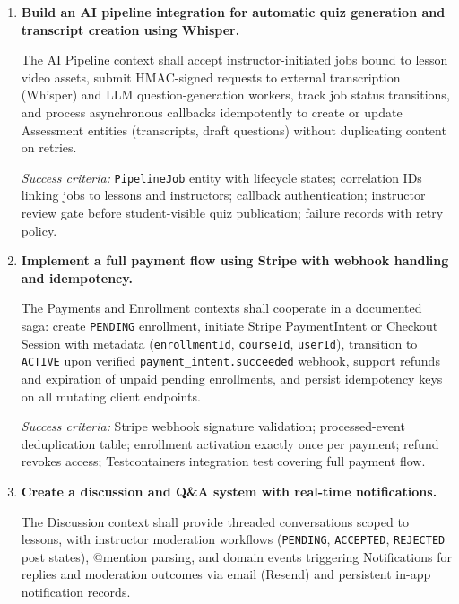 \begin{enumerate}
  \textit{Success criteria:} Webhook signature verification; idempotent handler keyed by Mux event identifier; playback authorisation integrated with Enrollment/Progress guards; instructor dashboard listing assets with error diagnostics; integration test simulating webhook delivery.

  \item \textbf{Build an AI pipeline integration for automatic quiz generation and transcript creation using Whisper.}

  The AI Pipeline context shall accept instructor-initiated jobs bound to lesson video assets, submit HMAC-signed requests to external transcription (Whisper) and LLM question-generation workers, track job status transitions, and process asynchronous callbacks idempotently to create or update Assessment entities (transcripts, draft questions) without duplicating content on retries.

  \textit{Success criteria:} \texttt{PipelineJob} entity with lifecycle states; correlation IDs linking jobs to lessons and instructors; callback authentication; instructor review gate before student-visible quiz publication; failure records with retry policy.

  \item \textbf{Implement a full payment flow using Stripe with webhook handling and idempotency.}

  The Payments and Enrollment contexts shall cooperate in a documented saga: create \texttt{PENDING} enrollment, initiate Stripe PaymentIntent or Checkout Session with metadata (\texttt{enrollmentId}, \texttt{courseId}, \texttt{userId}), transition to \texttt{ACTIVE} upon verified \texttt{payment\_intent.succeeded} webhook, support refunds and expiration of unpaid pending enrollments, and persist idempotency keys on all mutating client endpoints.

  \textit{Success criteria:} Stripe webhook signature validation; processed-event deduplication table; enrollment activation exactly once per payment; refund revokes access; Testcontainers integration test covering full payment flow.

  \item \textbf{Create a discussion and Q\&A system with real-time notifications.}

  The Discussion context shall provide threaded conversations scoped to lessons, with instructor moderation workflows (\texttt{PENDING}, \texttt{ACCEPTED}, \texttt{REJECTED} post states), @mention parsing, and domain events triggering Notifications for replies and moderation outcomes via email (Resend) and persistent in-app notification records.


\end{enumerate}
